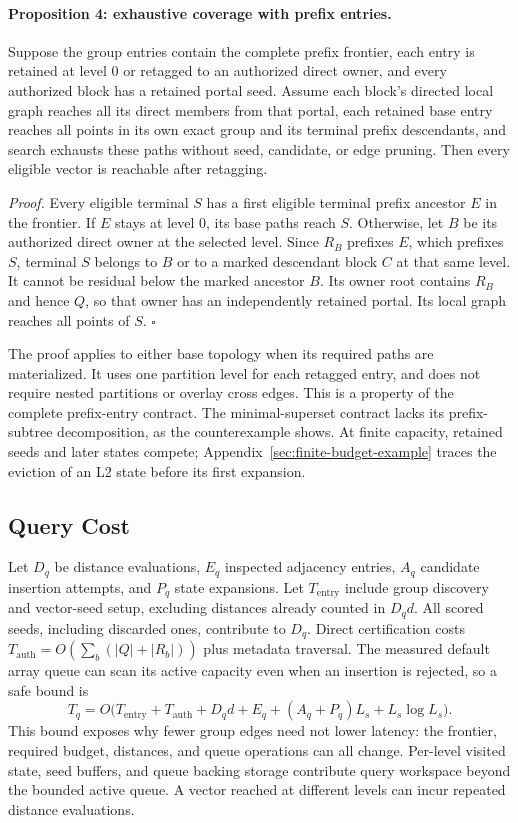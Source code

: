 \paragraph{Proposition 4: exhaustive coverage with prefix entries.}
Suppose the group entries contain the complete prefix frontier, each entry
is retained at level 0 or retagged to an authorized direct owner, and every
authorized block has a retained portal seed. Assume each block's directed
local graph reaches all its direct members from that portal, each retained
base entry reaches all points in its own exact group and its terminal
prefix descendants, and search
exhausts these paths without seed, candidate, or edge pruning. Then every
eligible vector is reachable after retagging.

\emph{Proof.} Every eligible terminal $S$ has a first eligible terminal
prefix ancestor $E$ in the frontier. If $E$ stays at level 0, its base paths
reach $S$. Otherwise, let $B$ be its authorized direct owner at the selected
level. Since $R_B$ prefixes $E$, which prefixes $S$, terminal $S$ belongs
to $B$ or to a marked descendant block $C$ at that same level. It cannot
be residual below the marked ancestor $B$. Its owner root contains $R_B$
and hence $Q$, so that owner has an independently retained portal. Its local
graph reaches all points of $S$. \hfill$\square$

The proof applies to either base topology when its required paths are
materialized. It uses one partition level for each retagged entry, and does
not require nested partitions or overlay cross edges. This is a property of
the complete prefix-entry contract. The minimal-superset contract lacks its
prefix-subtree decomposition, as the counterexample shows. At finite capacity,
retained seeds and later states compete; Appendix~\ref{sec:finite-budget-example}
traces the eviction of an L2 state before its first expansion.

\subsection{Query Cost}
Let $D_q$ be distance evaluations, $E_q$ inspected adjacency entries, $A_q$
candidate insertion attempts, and $P_q$ state expansions. Let
$T_{\mathrm{entry}}$ include group discovery and vector-seed setup, excluding
distances already counted in $D_qd$. All scored seeds, including discarded
ones, contribute to $D_q$.  Direct certification
costs $T_{\mathrm{auth}}=O(\sum_b(|Q|+|R_b|))$ plus metadata traversal.
The measured default array queue can scan its active capacity even when an
insertion is rejected, so a safe bound is
\begin{equation}
 T_q=O\bigl(T_{\mathrm{entry}}+T_{\mathrm{auth}}+D_qd+E_q
                  +(A_q+P_q)L_s+L_s\log L_s\bigr).
\end{equation}
This bound exposes why fewer group edges need not lower latency: the
frontier, required budget, distances, and queue operations can all change.
Per-level visited state, seed buffers, and queue backing storage contribute
query workspace beyond the bounded active queue. A vector reached at different
levels can incur repeated distance evaluations.
